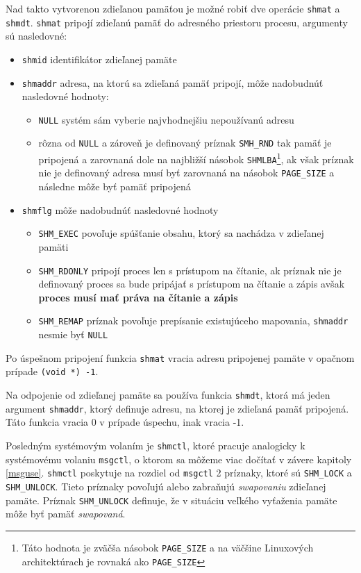 Nad takto vytvorenou zdieľanou pamäťou je možné robiť dve operácie \texttt{shmat} a \texttt{shmdt}. \texttt{shmat} pripojí zdieľanú pamäť do adresného priestoru procesu, argumenty sú nasledovné:
\begin{itemize}
\item \texttt{shmid} identifikátor zdieľanej pamäte
\item \texttt{shmaddr} adresa, na ktorú sa zdieľaná pamäť pripojí, môže nadobudnúť nasledovné hodnoty:
\begin{itemize}
\item \texttt{NULL} systém sám vyberie najvhodnejšiu nepoužívanú adresu
\item rôzna od \texttt{NULL} a zároveň je definovaný príznak \texttt{SMH\_RND} tak pamäť je pripojená a zarovnaná dole na najbližší násobok  \texttt{SHMLBA}\footnote{Táto hodnota je zväčša násobok \texttt{PAGE\_SIZE} a na väčšine Linuxových architektúrach je rovnaká ako \texttt{PAGE\_SIZE}}, ak však príznak nie je definovaný adresa musí byť zarovnaná na násobok \texttt{PAGE\_SIZE} a následne môže byť pamäť pripojená
\end{itemize}
\item \texttt{shmflg} môže nadobudnúť nasledovné hodnoty
\begin{itemize}
\item \texttt{SHM\_EXEC} povoľuje spúšťanie obsahu, ktorý sa nachádza v zdieľanej pamäti 
\item \texttt{SHM\_RDONLY} pripojí proces len s prístupom na čítanie, ak príznak nie je definovaný proces sa bude pripájať s prístupom na čítanie a zápis avšak \textbf{proces musí mať práva na čítanie a zápis} 
\item \texttt{SHM\_REMAP} príznak povoľuje prepísanie existujúceho mapovania, \texttt{shmaddr} nesmie byť \texttt{NULL}
\end{itemize}
\end{itemize}
Po úspešnom pripojení funkcia \texttt{shmat} vracia adresu pripojenej pamäte v opačnom prípade \texttt{(void *) -1}. 

Na odpojenie od zdieľanej pamäte sa používa funkcia \texttt{shmdt}, ktorá má jeden argument \texttt{shmaddr}, ktorý definuje adresu, na ktorej je zdieľaná pamäť pripojená. Táto funkcia vracia 0 v prípade úspechu, inak vracia -1.

Posledným systémovým volaním je \texttt{shmctl}, ktoré pracuje analogicky k systémovému volaniu \texttt{msgctl}, o ktorom sa môžeme viac dočítať v závere kapitoly \ref{msguse}. \texttt{shmctl} poskytuje na rozdiel od \texttt{msgctl} 2 príznaky, ktoré sú \texttt{SHM\_LOCK} a \texttt{SHM\_UNLOCK}. Tieto príznaky povoľujú alebo zabraňujú \textit{swapovaniu} zdieľanej pamäte. Príznak \texttt{SHM\_UNLOCK} definuje, že v situáciu veľkého vyťaženia pamäte môže byť pamäť \textit{swapovaná}.\cite{shmctl}

